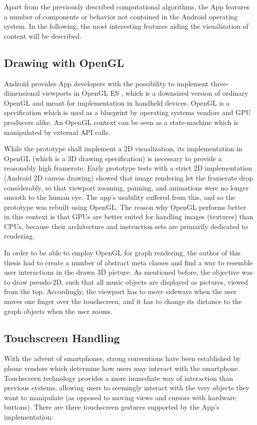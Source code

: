 Apart from the previously described computational algorithms, the App features a number of components or behavior not contained in the Android operating system. In the following, the most interesting features aiding the visualization of content will be described.

\subsection{Drawing with OpenGL}

Android provides App developers with the possibility to implement three-dimensional viewports in OpenGL ES \cite{url:opengles}, which is a downsized version of ordinary OpenGL and meant for implementation in handheld devices. OpenGL is a specification which is used as a blueprint by operating systems vendors and GPU producers alike. An OpenGL context can be seen as a state-machine which is manipulated by external API calls.

While the prototype shall implement a 2D visualization, its implementation in OpenGL (which is a 3D drawing specification) is necessary to provide a reasonably high framerate. Early prototype tests with a strict 2D implementation (Android 2D canvas drawing) showed that image rendering let the framerate drop considerably, so that viewport zooming, panning, and animations were no longer smooth to the human eye. The app's usability suffered from this, and so the prototype was rebuilt using OpenGL. The reason why OpenGL performs better in this context is that GPUs are better suited for handling images (textures) than CPUs, because their architecture and instruction sets are primarily dedicated to rendering.

In order to be able to employ OpenGL for graph rendering, the author of this thesis had to create a number of abstract meta classes and find a way to resemble user interactions in the drawn 3D picture. As mentioned before, the objective was to draw pseudo-2D, such that all music objects are displayed as pictures, viewed from the top. Accordingly, the viewport has to move sideways when the user moves one finger over the touchscreen, and it has to change its distance to the graph objects when the user zooms.

\subsection{Touchscreen Handling}

With the advent of smartphones, strong conventions have been established by phone vendors which determine how users may interact with the smartphone. Touchscreen technology provides a more immediate way of interaction than previous systems, allowing users to seemingly interact with the very objects they want to manipulate (as opposed to moving views and cursors with hardware buttons).
There are three touchscreen gestures supported by the App's implementation:


